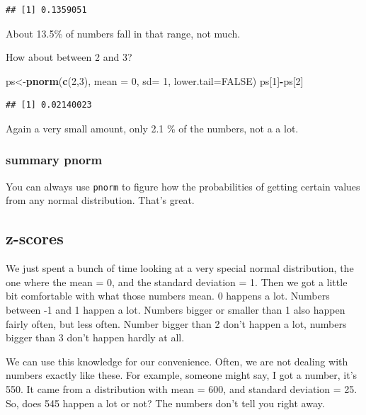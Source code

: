 \documentclass[]{book}
\newenvironment{Shaded}{\begin{snugshade}}{\end{snugshade}}
\newcommand{\KeywordTok}[1]{\textcolor[rgb]{0.13,0.29,0.53}{\textbf{#1}}}
\newcommand{\DataTypeTok}[1]{\textcolor[rgb]{0.13,0.29,0.53}{#1}}
\newcommand{\DecValTok}[1]{\textcolor[rgb]{0.00,0.00,0.81}{#1}}
\newcommand{\OtherTok}[1]{\textcolor[rgb]{0.56,0.35,0.01}{#1}}
\newcommand{\OperatorTok}[1]{\textcolor[rgb]{0.81,0.36,0.00}{\textbf{#1}}}
\newcommand{\NormalTok}[1]{#1}
\begin{document}
\begin{verbatim}
## [1] 0.1359051
\end{verbatim}

About 13.5\% of numbers fall in that range, not much.

How about between 2 and 3?

\begin{Shaded}
\begin{Highlighting}[]
\NormalTok{ps<-}\KeywordTok{pnorm}\NormalTok{(}\KeywordTok{c}\NormalTok{(}\DecValTok{2}\NormalTok{,}\DecValTok{3}\NormalTok{), }\DataTypeTok{mean =} \DecValTok{0}\NormalTok{, }\DataTypeTok{sd=} \DecValTok{1}\NormalTok{, }\DataTypeTok{lower.tail=}\OtherTok{FALSE}\NormalTok{)}
\NormalTok{ps[}\DecValTok{1}\NormalTok{]}\OperatorTok{-}\NormalTok{ps[}\DecValTok{2}\NormalTok{]}
\end{Highlighting}
\end{Shaded}

\begin{verbatim}
## [1] 0.02140023
\end{verbatim}

Again a very small amount, only 2.1 \% of the numbers, not a a lot.

\subsubsection{summary pnorm}\label{summary-pnorm}

You can always use \texttt{pnorm} to figure how the probabilities of
getting certain values from any normal distribution. That's great.

\subsection{z-scores}\label{z-scores}

We just spent a bunch of time looking at a very special normal
distribution, the one where the mean = 0, and the standard deviation =
1. Then we got a little bit comfortable with what those numbers mean. 0
happens a lot. Numbers between -1 and 1 happen a lot. Numbers bigger or
smaller than 1 also happen fairly often, but less often. Number bigger
than 2 don't happen a lot, numbers bigger than 3 don't happen hardly at
all.

We can use this knowledge for our convenience. Often, we are not dealing
with numbers exactly like these. For example, someone might say, I got a
number, it's 550. It came from a distribution with mean = 600, and
standard deviation = 25. So, does 545 happen a lot or not? The numbers
don't tell you right away.
\end{document}
